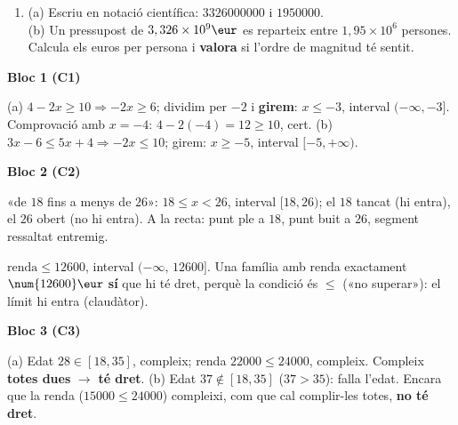 \begin{enumerate}[label=\textbf{\arabic*.}, leftmargin=2em, itemsep=8pt, start=5]
  \item (a) Escriu en notació científica: $\num{3326000000}$ i $\num{1950000}$.\\
        (b) Un pressupost de $3,326\times 10^{9}\eur$ es reparteix entre
        $1,95\times 10^{6}$ persones. Calcula els euros per persona i \textbf{valora}
        si l'ordre de magnitud té sentit.
\end{enumerate}

\newpage
\begin{solucions}

\noindent\textbf{Bloc 1 (C1)}
\begin{sollist}
  \item (a) $4-2x\ge 10 \Rightarrow -2x\ge 6$; dividim per $-2$ i \textbf{girem}:
        $x\le -3$, interval $(-\infty,-3]$. Comprovació amb $x=-4$:
        $4-2(-4)=12\ge 10$, cert. \quad
        (b) $3x-6\le 5x+4 \Rightarrow -2x\le 10$; girem: $x\ge -5$, interval
        $[-5,+\infty)$.
\end{sollist}

\noindent\textbf{Bloc 2 (C2)}
\begin{sollist}\setcounter{enumi}{1}
  \item «de $18$ fins a menys de $26$»: $18\le x<26$, interval $[18,26)$; el $18$
        tancat (hi entra), el $26$ obert (no hi entra). A la recta: punt ple a $18$,
        punt buit a $26$, segment ressaltat entremig.
  \item $\text{renda}\le\num{12600}$, interval $(-\infty,\,\num{12600}]$. Una família
        amb renda exactament $\num{12600}\eur$ \textbf{sí} que hi té dret, perquè la
        condició és $\le$ («no superar»): el límit hi entra (claudàtor).
\end{sollist}

\noindent\textbf{Bloc 3 (C3)}
\begin{sollist}\setcounter{enumi}{3}
  \item (a) Edat $28\in[18,35]$, compleix; renda $\num{22000}\le\num{24000}$,
        compleix. Compleix \textbf{totes dues} $\rightarrow$ \textbf{té dret}. \quad
        (b) Edat $37\notin[18,35]$ ($37>35$): falla l'edat. Encara que la renda
        ($\num{15000}\le\num{24000}$) compleixi, com que cal complir-les totes,
        \textbf{no té dret}.
\end{sollist}


\end{solucions}
